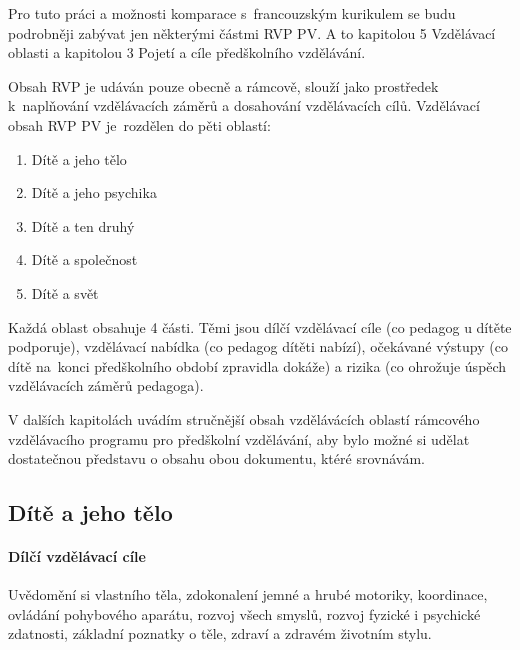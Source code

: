 		Pro tuto práci a možnosti komparace s francouzským kurikulem se budu podrobněji zabývat jen některými částmi RVP PV. A to kapitolou 5 Vzdělávací oblasti a kapitolou 3 Pojetí a cíle předškolního vzdělávání.

		Obsah RVP je udáván pouze obecně a rámcově, slouží jako prostředek k naplňování
		vzdělávacích záměrů a dosahování vzdělávacích cílů. Vzdělávací obsah RVP PV je rozdělen do pěti oblastí:

		\begin{enumerate}[1.]
		\item Dítě a jeho tělo
		\item Dítě a jeho psychika
		\item Dítě a ten druhý
		\item Dítě a společnost
		\item Dítě a svět
		\end{enumerate}

		Každá oblast obsahuje 4 části. Těmi jsou dílčí vzdělávací cíle (co pedagog u dítěte podporuje), vzdělávací nabídka (co pedagog dítěti nabízí), očekávané výstupy (co dítě na konci předškolního období zpravidla dokáže) a rizika (co ohrožuje úspěch vzdělávacích záměrů pedagoga).

		V dalších kapitolách uvádím stručnější obsah vzdělávácích oblastí rámcového vzdělávacího programu pro předškolní vzdělávání, aby bylo možné si udělat dostatečnou představu o obsahu obou dokumentu, ktéré srovnávám. 

			\subsection{Dítě a jeho tělo}
				\textit{} \citep[s.~16]{RVP}

				\paragraph{Dílčí vzdělávací cíle} 
					Uvědomění si vlastního těla, zdokonalení jemné a hrubé motoriky, koordinace, ovládání pohybového aparátu, rozvoj všech smyslů, rozvoj fyzické i psychické zdatnosti, základní poznatky o těle, zdraví a zdravém životním stylu.
